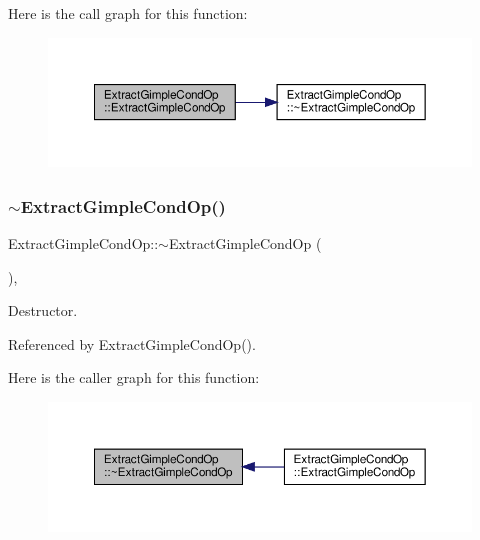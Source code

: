 Here is the call graph for this function\+:
\nopagebreak
\begin{figure}[H]
\begin{center}
\leavevmode
\includegraphics[width=350pt]{d4/df2/classExtractGimpleCondOp_a380c10f0841276b9179b8964b17019f2_cgraph}
\end{center}
\end{figure}
\mbox{\label{classExtractGimpleCondOp_aa48e5602260eb94b3cf274d7ab7bc9ed}} 
\subsubsection{\texorpdfstring{$\sim$\+Extract\+Gimple\+Cond\+Op()}{~ExtractGimpleCondOp()}}
{\footnotesize\ttfamily Extract\+Gimple\+Cond\+Op\+::$\sim$\+Extract\+Gimple\+Cond\+Op (\begin{DoxyParamCaption}{ }\end{DoxyParamCaption})\hspace{0.3cm}{\ttfamily [override]}, {\ttfamily [default]}}



Destructor. 



Referenced by Extract\+Gimple\+Cond\+Op().

Here is the caller graph for this function\+:
\nopagebreak
\begin{figure}[H]
\begin{center}
\leavevmode
\includegraphics[width=350pt]{d4/df2/classExtractGimpleCondOp_aa48e5602260eb94b3cf274d7ab7bc9ed_icgraph}
\end{center}
\end{figure}


